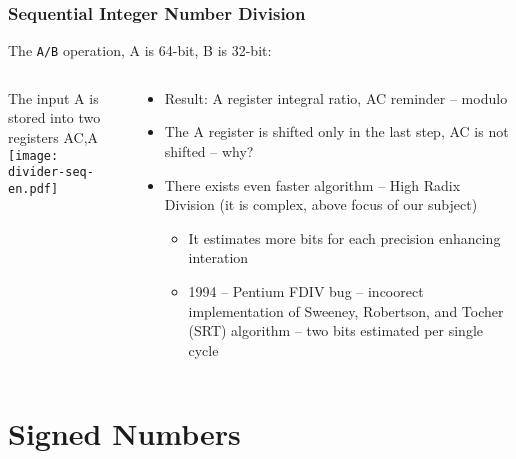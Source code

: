 \documentclass{beamer}
\begin{document}
\begin{frame}
\frametitle{Sequential Integer Number Division}

The \texttt{A/B} operation, A is 64-bit, B is 32-bit:\\
\begin{columns}
\begin{column}{0.45\textwidth}
The input A is stored into two registers AC,A\\
\texttt{[image: divider-seq-en.pdf]}
\end{column}
\hfill
\begin{column}{0.55\textwidth}
\begin{itemize}
\item Result: A register integral ratio, AC reminder -- modulo
\item The A register is shifted only in the last step, AC is not shifted -- why?
\item There exists even faster algorithm -- High Radix Division (it is complex, above focus of our subject)
\begin{itemize}
\item It estimates more bits for each precision enhancing interation
\item 1994 -- Pentium FDIV bug -- incoorect implementation of Sweeney, Robertson, and Tocher (SRT) algorithm -- two bits estimated per single cycle
\end{itemize}
\end{itemize}
\end{column}
\end{columns}


\end{frame}


\section{Signed Numbers}
\end{document}
